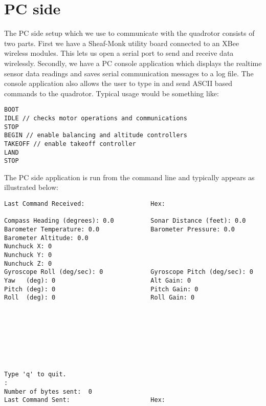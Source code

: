 \section{PC side}
The PC side setup which we use to communicate with the quadrotor consists of two parts. First we have a Sheaf-Monk utility board connected to an XBee wireless modules.  This lets us open a serial port to send and receive data wirelessly.  Secondly, we have a PC console application which displays the realtime sensor data readings and saves serial communication messages to a log file.  The console application also allows the user to type in and send ASCII based commands to the quadrotor.  Typical usage would be something like:\\
\newline
\begin{lstlisting}[frame=single]
BOOT
IDLE // checks motor operations and communications
STOP
BEGIN // enable balancing and altitude controllers
TAKEOFF // enable takeoff controller
LAND
STOP 
\end{lstlisting}

\clearpage
The PC side application is run from the command line and typically appears as illustrated below:\\
\begin{lstlisting}[frame=single]
Last Command Received:                  Hex:

Compass Heading (degrees): 0.0          Sonar Distance (feet): 0.0
Barometer Temperature: 0.0              Barometer Pressure: 0.0
Barometer Altitude: 0.0
Nunchuck X: 0
Nunchuck Y: 0
Nunchuck Z: 0
Gyroscope Roll (deg/sec): 0             Gyroscope Pitch (deg/sec): 0
Yaw   (deg): 0                          Alt Gain: 0
Pitch (deg): 0                          Pitch Gain: 0
Roll  (deg): 0                          Roll Gain: 0








Type 'q' to quit.
:
Number of bytes sent:  0
Last Command Sent:                      Hex:
\end{lstlisting}
